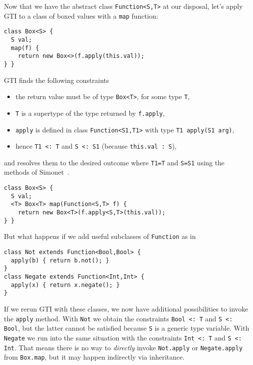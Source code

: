 Now that we have the abstract class \texttt{Function<S,T>} at our
disposal, let's apply GTI to a class of boxed values with a
\texttt{map} function:
\begin{lstlisting}
class Box<S> {
  S val;
  map(f) {
    return new Box<>(f.apply(this.val));
} }
\end{lstlisting}
GTI finds the following constraints
\begin{itemize}
\item the return value must be of type \texttt{Box<T>}, for some type
  \texttt{T},
\item \texttt{T} is a supertype of the type returned by
  \texttt{f.apply},
\item \texttt{apply} is defined in class \texttt{Function<S1,T1>} with
  type \texttt{T1 apply(S1 arg)}, 
\item hence \texttt{T1 <: T} and \texttt{S <: S1} (because
  \texttt{this.val : S}),
\end{itemize}
and resolves them to the desired outcome where \texttt{T1=T} and
\texttt{S=S1} using the methods of
Simonet~\cite{DBLP:conf/aplas/Simonet03}. 
\begin{lstlisting}
class Box<S> {
  S val;
  <T> Box<T> map(Function<S,T> f) {
    return new Box<T>(f.apply<S,T>(this.val));
} }
\end{lstlisting}
But what happens if we add useful subclasses of \texttt{Function} as in
\begin{lstlisting}
class Not extends Function<Bool,Bool> {
  apply(b) { return b.not(); }
}
class Negate extends Function<Int,Int> {
  apply(x) { return x.negate(); }
}
\end{lstlisting}
If we rerun GTI with these classes, we now have additional
possibilities to invoke the \texttt{apply} method. With \texttt{Not}
we obtain the constraints \texttt{Bool <: T} and \texttt{S <: Bool}, but the latter cannot
be satisfied because \texttt{S} is a generic type variable. With
\texttt{Negate} we run into the same situation with the constraints
\texttt{Int <: T} and \texttt{S <: Int}. That means there is no way to
\emph{directly} invoke \texttt{Not.apply} or \texttt{Negate.apply}
from \texttt{Box.map}, but it may happen indirectly via inheritance.

